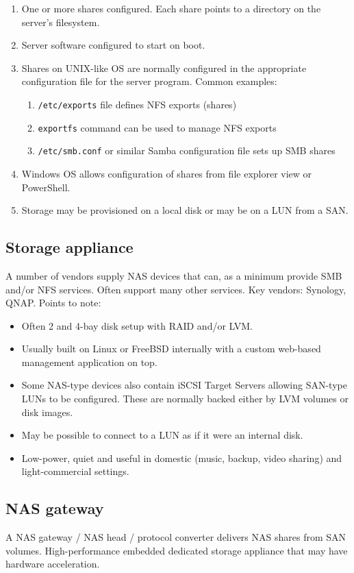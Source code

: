 \begin{enumerate}
\item
  One or more shares configured. Each share points to a directory on the
  server's filesystem.
\item
  Server software configured to start on boot.
\item
  Shares on UNIX-like OS are normally configured in the appropriate
  configuration file for the server program. Common examples:

  \begin{enumerate}
  \item
    \texttt{/etc/exports} file defines NFS exports (shares)
  \item
    \texttt{exportfs} command can be used to manage NFS exports
  \item
    \texttt{/etc/smb.conf} or similar Samba configuration file sets up
    SMB shares
  \end{enumerate}
\item
  Windows OS allows configuration of shares from file explorer view or
  PowerShell.
\item
  Storage may be provisioned on a local disk or may be on a LUN from a
  SAN.
\end{enumerate}

\subsection{Storage appliance}
\label{sec:storage-appliance}

A number of vendors supply NAS devices that can, as a minimum provide
SMB and/or NFS services. Often support many other services. Key vendors:
Synology, QNAP. Points to note:

\begin{itemize}
\item
  Often 2 and 4-bay disk setup with RAID and/or LVM.
\item
  Usually built on Linux or FreeBSD internally with a custom web-based
  management application on top.
\item
  Some NAS-type devices also contain iSCSI Target Servers allowing
  SAN-type LUNs to be configured. These are normally backed either by
  LVM volumes or disk images.
\item
  May be possible to connect to a LUN as if it were an internal disk.
\item
  Low-power, quiet and useful in domestic (music, backup, video sharing)
  and light-commercial settings.
\end{itemize}

\subsection{NAS gateway}
\label{sec:nas-gateway}

A NAS gateway / NAS head / protocol converter delivers NAS shares from
SAN volumes. High-performance embedded dedicated storage appliance that
may have hardware acceleration.
